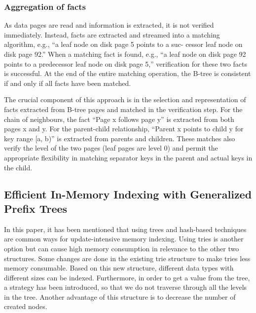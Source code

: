 \documentclass[12pt]{report}
\begin{document}
\subsubsection{Aggregation of facts}

As data pages are read and information is extracted, it is not verified immediately. Instead, facts are extracted and streamed into a matching algorithm, e.g., “a leaf node on disk page 5 points to a suc-
cessor leaf node on disk page 92.” When a matching fact is found, e.g., “a leaf node on disk page 92 points to a predecessor leaf node on disk page 5,” verification for these two facts is successful. At the end of the entire matching operation, the B-tree is consistent if and only if all facts have been matched.

The crucial component of this approach is in the selection and representation of facts extracted from B-tree pages and matched in the verification step. For the chain of neighbours, the fact “Page x follows page y” is extracted from both pages x and y. For the parent-child relationship, “Parent x points to child y for key range [a, b)” is extracted
from parents and children. These matches also verify the level of the two pages (leaf pages are level 0) and permit the appropriate flexibility in matching separator keys in the parent and actual keys in the child.

\subsection{Efficient In-Memory Indexing with Generalized Prefix Trees \cite{Boehm}}

In this paper, it has been mentioned that using trees and hash-based techniques are common ways for update-intensive memory indexing. Using tries is another option but can cause high memory consumption in relevance to the other two structures. Some changes are done in the existing trie structure to make tries less memory consumable. Based on this new structure, different data types with different sizes can be indexed. Furthermore, in order to get a value from the tree, a strategy has been introduced, so that we do not traverse through all the levels in the tree. Another advantage of this structure is to decrease the number of created nodes. 
\end{document}
